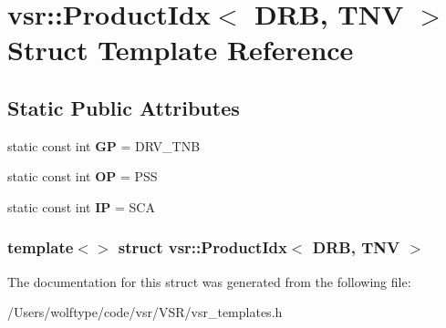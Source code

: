 \hypertarget{structvsr_1_1_product_idx_3_01_d_r_b_00_01_t_n_v_01_4}{\section{vsr\-:\-:Product\-Idx$<$ D\-R\-B, T\-N\-V $>$ Struct Template Reference}
\label{structvsr_1_1_product_idx_3_01_d_r_b_00_01_t_n_v_01_4}
}
\subsection*{Static Public Attributes}
\begin{DoxyCompactItemize}
\item 
\hypertarget{structvsr_1_1_product_idx_3_01_d_r_b_00_01_t_n_v_01_4_a9db0f2ccf96eb672e06ddd1789db6d47}{static const int {\bfseries G\-P} = D\-R\-V\-\_\-\-T\-N\-B}\label{structvsr_1_1_product_idx_3_01_d_r_b_00_01_t_n_v_01_4_a9db0f2ccf96eb672e06ddd1789db6d47}

\item 
\hypertarget{structvsr_1_1_product_idx_3_01_d_r_b_00_01_t_n_v_01_4_af7e27426e05a167ea4cc5c49acd34818}{static const int {\bfseries O\-P} = P\-S\-S}\label{structvsr_1_1_product_idx_3_01_d_r_b_00_01_t_n_v_01_4_af7e27426e05a167ea4cc5c49acd34818}

\item 
\hypertarget{structvsr_1_1_product_idx_3_01_d_r_b_00_01_t_n_v_01_4_a451ba5aafcab48f14799c960dbe16b74}{static const int {\bfseries I\-P} = S\-C\-A}\label{structvsr_1_1_product_idx_3_01_d_r_b_00_01_t_n_v_01_4_a451ba5aafcab48f14799c960dbe16b74}

\end{DoxyCompactItemize}
\subsubsection*{template$<$$>$ struct vsr\-::\-Product\-Idx$<$ D\-R\-B, T\-N\-V $>$}



The documentation for this struct was generated from the following file\-:\begin{DoxyCompactItemize}
\item 
/\-Users/wolftype/code/vsr/\-V\-S\-R/vsr\-\_\-templates.\-h\end{DoxyCompactItemize}
